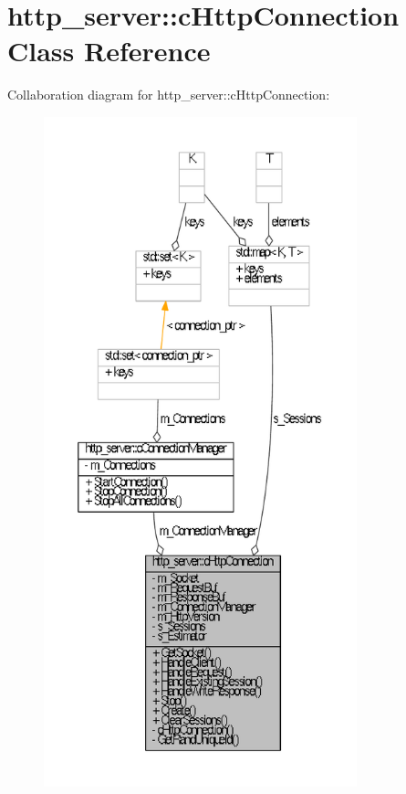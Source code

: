 \hypertarget{classhttp__server_1_1cHttpConnection}{\section{http\-\_\-server\-:\-:c\-Http\-Connection \-Class \-Reference}
\label{classhttp__server_1_1cHttpConnection}
}


\-Collaboration diagram for http\-\_\-server\-:\-:c\-Http\-Connection\-:
\nopagebreak
\begin{figure}[H]
\begin{center}
\leavevmode
\includegraphics[height=550pt]{classhttp__server_1_1cHttpConnection__coll__graph}
\end{center}
\end{figure}
